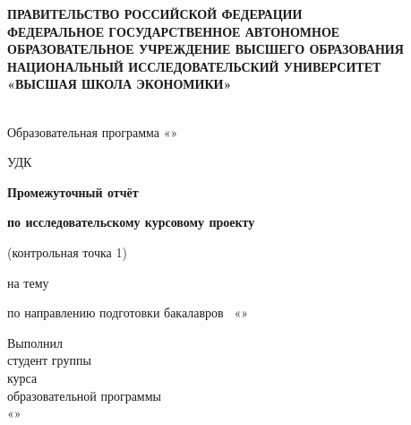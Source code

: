 %
\begin{titlepage}
\thispagestyle{empty}
\singlespacing
\footnotesize
\setlength{\parindent}{0pt}
\setlength{\parskip}{0pt}


\begin{center}
\textbf{ПРАВИТЕЛЬСТВО РОССИЙСКОЙ ФЕДЕРАЦИИ}\\
\textbf{ФЕДЕРАЛЬНОЕ ГОСУДАРСТВЕННОЕ АВТОНОМНОЕ}\\
\textbf{ОБРАЗОВАТЕЛЬНОЕ УЧРЕЖДЕНИЕ ВЫСШЕГО ОБРАЗОВАНИЯ}\\
\textbf{НАЦИОНАЛЬНЫЙ ИССЛЕДОВАТЕЛЬСКИЙ УНИВЕРСИТЕТ}\\
\textbf{«ВЫСШАЯ ШКОЛА ЭКОНОМИКИ»}

\vspace{0.35cm}
\hseFaculty\\
Образовательная программа «\hseSpecialization»
\end{center}

\vspace{0.25cm}
\noindent
УДК~\hseUDC

\vspace{1.6cm}
\begin{center}
\textbf{\normalsize Промежуточный отчёт}

\vspace{0.12cm}
\textbf{\normalsize по исследовательскому курсовому проекту}

\vspace{0.12cm}
(контрольная точка 1)

\vspace{0.35cm}
на тему
\underline{\makebox[0.8\textwidth][c]{\hseProjectName}}

\vspace{0.3cm}
по направлению подготовки бакалавров \hseProgramCode\ «\hseSpecialization»
\end{center}

\vspace{1.4cm}
\noindent\hfill
\begin{minipage}[t]{0.52\textwidth}
\raggedright
Выполнил\\
студент группы \hseGroup\\
\hseCourse{} курса \hseDegreeLevel\\
образовательной программы\\
«\hseSpecialization»


\end{minipage}
\end{titlepage}
